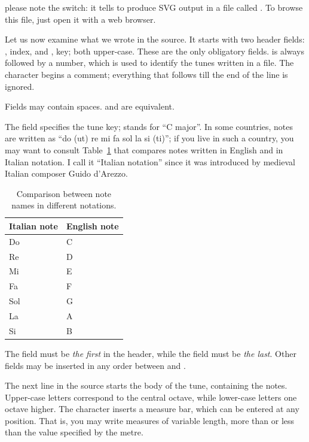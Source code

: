 \documentclass[a4paper,12pt]{book}
\begin{document}
please note the  switch: it tells \abcm{} to produce SVG
output in a file called . To browse this file, just
open it with a web browser.


Let us now examine what we wrote in the source. It starts with two
header fields: , index, and , key; both
upper-case. These are the only obligatory fields.  is always
followed by a number, which is used to identify the tunes written in a
file. The \car{\%} character begins a comment; everything that follows
\car{\%} till the end of the line is ignored.

Fields may contain spaces.  and  are
equivalent.

The  field specifies the tune key;  stands for ``C
major''. In some countries, notes are written as ``do (ut) re mi fa
sol la si (ti)''; if you live in such a country, you may want to
consult Table~\ref{tab:note} that compares notes written in English
and in Italian notation. I call it ``Italian notation'' since it was
introduced by medieval Italian composer Guido d'Arezzo.

\begin{table}[h]
\begin{center}
\begin{tabular}{ll}
\toprule %
\textbf{Italian note} & \textbf{English note} \\
\midrule %
Do & C \\
Re & D \\
Mi & E \\
Fa & F \\
Sol & G\\
La & A \\
Si & B\\
\bottomrule %
\end{tabular}
\caption{Comparison between note names in different notations.}
\label{tab:note}
\end{center}
\end{table}

The  field must be \emph{the first} in the header, while the
 field must be \emph{the last}. Other fields may be inserted
in any order between  and .

The next line in the source starts the body of the tune, containing
the notes. Upper-case letters correspond to the central octave, while
lower-case letters one octave higher. The \car{\textbar} character
inserts a measure bar, which can be entered at any position. That is,
you may write measures of variable length, more than or less than the
value specified by the metre.
\end{document}
